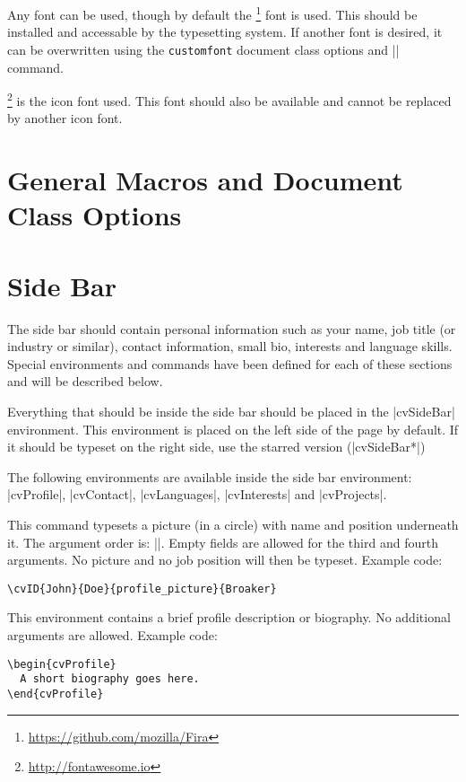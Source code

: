 \documentclass{ltxdoc}
\begin{document}
  Any font can be used, though by default the \footnote{\url{https://github.com/mozilla/Fira}} font is used. This should be installed and accessable by the typesetting system. If another font is desired, it can be overwritten using the \lstinline|customfont| document class options and |\cvMainFont| command. 

  \footnote{\url{http://fontawesome.io}} is the icon font used. This font should also be available and cannot be replaced by another icon font. 

\section{General Macros and Document Class Options}

\section{Side Bar}

  The side bar should contain personal information such as your name, job title (or industry or similar), contact information, small bio, interests and language skills. Special environments and commands have been defined for each of these sections and will be described below. 

  Everything that should be inside the side bar should be placed in the |cvSideBar| environment. This environment is placed on the left side of the page by default. If it should be typeset on the right side, use the starred version (|cvSideBar*|)

  The following environments are available inside the side bar environment: |cvProfile|, |cvContact|, |cvLanguages|, |cvInterests| and |cvProjects|.
  
  \DescribeMacro{\cvID}
  This command typesets a picture (in a circle) with name and position underneath it.
  The argument order is: ||. Empty fields are allowed for the third and fourth arguments. No picture and no job position will then be typeset. Example code: 
  \begin{lstlisting}
\cvID{John}{Doe}{profile_picture}{Broaker}
  \end{lstlisting}
  
  This environment contains a brief profile description or biography. No additional arguments are allowed. Example code:
  \begin{lstlisting}
\begin{cvProfile}
  A short biography goes here.
\end{cvProfile}
  \end{lstlisting}
  
\end{document}
